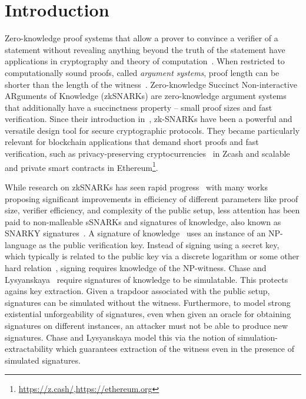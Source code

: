 \section{Introduction}
Zero-knowledge proof systems that allow a prover to convince a verifier of a statement without revealing anything beyond the truth of the statement have applications in cryptography and theory of computation~\cite{FOCS:GolMicWig86,STOC:Fortnow87,C:BGGHKMR88}. 
When restricted to computationally sound proofs, called \emph{argument systems}, proof length can be shorter than the length of the witness~\cite{brassard1988minimum}. 
Zero-knowledge Succinct Non-interactive ARguments of Knowledge (zkSNARKs) are zero-knowledge argument systems that additionally have a succinctness property -- small proof sizes and fast verification. 
Since their introduction in~\cite{FOCS:Micali94}, zk-SNARKs have been a powerful and versatile design tool for secure cryptographic protocols. They became particularly relevant for blockchain applications that demand short proofs and fast verification, such as privacy-preserving cryptocurrencies~\cite{SP:BCGGMT14} in Zcash and scalable and private smart contracts in Ethereum\footnote{\url{https://z.cash/},\url{https://ethereum.org}}.


While research on zkSNARKs has seen rapid progress~\cite{EC:GGPR13,IKO07,AC:Groth10a,TCC:Lipmaa12,TCC:BCIOP13,SP:PHGR13,C:BCGTV13,AC:Lipmaa13,USENIX:BCTV14,EC:Groth16} with many works proposing significant improvements in efficiency of different parameters like proof size, verifier efficiency, and complexity of the public setup, less attention has been paid to non-malleable sSNARKs and signatures of knowledge, also known as SNARKY signatures~\cite{C:GroMal17,EPRINT:BKSV20}. A signature of knowledge~\cite{C:CamSta97,C:ChaLys06} uses an instance of an NP-language as the public verification key. Instead of signing using a secret key, which typically is related to the public key via a discrete logarithm or some other hard relation~\cite{AC:DHLW10}, signing requires knowledge of the NP-witness. Chase and Lysyanskaya~\cite{C:ChaLys06} require signatures of knowledge to be simulatable. This protects agains key extraction. Given a trapdoor associated with the public setup, signatures can be simulated without the witness. Furthermore, to model strong existential unforgeability of signatures, even when given an oracle for obtaining signatures on different instances, an attacker must not be able to produce new signatures. Chase and Lysyanskaya model this via the notion of simulation-extractability which guarantees extraction of the witness even in the presence of simulated signatures.

